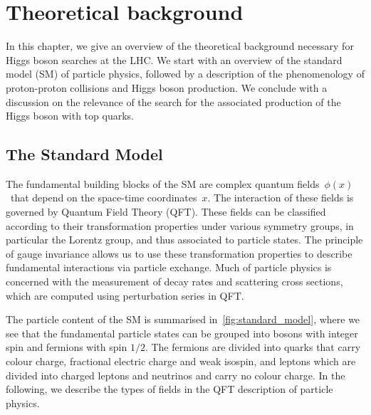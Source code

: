 \chapter{Theoretical background}
\label{sec:theory}
In this chapter, we give an overview of the theoretical background necessary for Higgs boson searches at the LHC. We start with an overview of the standard model (SM) of particle physics, followed by a description of the phenomenology of proton-proton collisions and Higgs boson production. We conclude with a discussion on the relevance of the search for the associated production of the Higgs boson with top quarks.

\section{The Standard Model}
The fundamental building blocks of the SM are complex quantum fields~$\phi(x)$~that depend on the space-time coordinates~$x$. The interaction of these fields is governed by Quantum Field Theory (QFT). These fields can be classified according to their transformation properties under various symmetry groups, in particular the Lorentz group, and thus associated to particle states. The principle of gauge invariance allows us to use these transformation properties to describe fundamental interactions via particle exchange. Much of particle physics is concerned with the measurement of decay rates and scattering cross sections, which are computed using perturbation series in QFT.

The particle content of the SM is summarised in~\cref{fig:standard_model}, where we see that the fundamental particle states can be grouped into bosons with integer spin and fermions with spin $1/2$. The fermions are divided into quarks that carry colour charge, fractional electric charge and weak isospin, and leptons which are divided into charged leptons and neutrinos and carry no colour charge. In the following, we describe the types of fields in the QFT description of particle physics.

